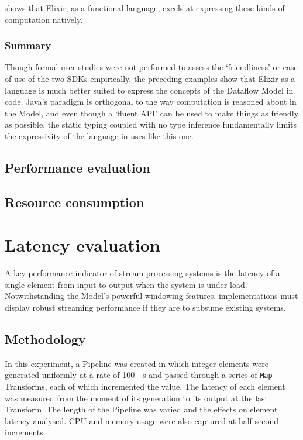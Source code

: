  shows that Elixir, as a functional language, excels at expressing these kinds of computation natively.

\subsubsection{Summary}

Though formal user studies were not performed to assess the `friendliness' or ease of use of the two SDKs empirically, the preceding examples show that Elixir as a language is much better suited to express the concepts of the Dataflow Model in code.
Java's paradigm is orthogonal to the way computation is reasoned about in the Model, and even though a `fluent API' can be used to make things as friendly as possible, the static typing coupled with no type inference fundamentally limits the expressivity of the language in uses like this one.


\subsection{Performance evaluation}\label{sec:eval:performance}

\subsection{Resource consumption}\label{sec:eval:resource}

\section{Latency evaluation}\label{sec:eval:latency}

A key performance indicator of stream-processing systems is the latency of a single element from input to output when the system is under load.
Notwithstanding the Model's powerful windowing features, implementations must display robust streaming performance if they are to subsume existing systems.

\subsection{Methodology}

In this experiment, a Pipeline was created in which integer elements were generated uniformly at a rate of \SI{100}{\per\second} and passed through a series of \verb|Map| Transforms, each of which incremented the value.
The latency of each element was measured from the moment of its generation to its output at the last Transform.
The length of the Pipeline was varied and the effects on element latency analysed.
CPU and memory usage were also captured at half-second increments.

